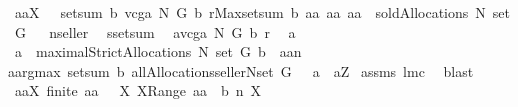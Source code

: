 \begin{isabellebody}
{\isacharparenleft}\ {\isachardoublequoteopen}{\isasymforall}aa{\isasymin}{\isacharquery}X{\isachardot}\ {\isacharunderscore}{\isachardoublequoteclose}{\isacharparenright}\ \ {\isachardoublequoteopen}setsum\ b\ {\isacharparenleft}vcga{\isacharprime}\ N\ G\ b\ r{\isacharparenright}{\isacharequal}Max{\isacharbraceleft}setsum\ b\ aa{\isacharbar}\ aa{\isachardot}\ aa\ {\isasymin}\ soldAllocations\ N\ {\isacharparenleft}set\ G{\isacharparenright}{\isacharbraceright}{\isachardoublequoteclose}\isanewline
%
\isadelimproof
%
\endisadelimproof
%
\isatagproof
{}\isamarkupfalse%
\ {\isacharminus}\isanewline
{}\isamarkupfalse%
\ {\isacharquery}n{\isacharequal}seller\ \isamarkupfalse%
\ {\isacharquery}s{\isacharequal}setsum\ \isamarkupfalse%
\ {\isacharquery}a{\isacharequal}{\isachardoublequoteopen}vcga{\isacharprime}\ N\ G\ b\ r{\isachardoublequoteclose}\ \isamarkupfalse%
\ a\ \ \isanewline
{}{\isacharcolon}\ {\isachardoublequoteopen}a\ {\isasymin}\ maximalStrictAllocations{\isacharprime}\ N\ {\isacharparenleft}set\ G{\isacharparenright}\ b\ {\isacharampersand}\ {\isacharquery}a{\isacharequal}a{\isacharminus}{\isacharminus}{\isacharquery}n\ {\isacharampersand}\ \isanewline
{\isacharparenleft}a{\isasymin}argmax\ {\isacharparenleft}setsum\ b{\isacharparenright}\ {\isacharparenleft}allAllocations{\isacharparenleft}{\isacharbraceleft}seller{\isacharbraceright}{\isasymunion}N{\isacharparenright}{\isacharparenleft}set\ G{\isacharparenright}{\isacharparenright}{\isacharparenright}{\isachardoublequoteclose}{\isacharparenleft}\ {\isachardoublequoteopen}{\isacharunderscore}\ {\isacharampersand}\ {\isacharquery}a{\isacharequal}{\isacharunderscore}\ {\isacharampersand}\ a{\isasymin}{\isacharquery}Z{\isachardoublequoteclose}{\isacharparenright}\isanewline
{}\isamarkupfalse%
\ assms{\isacharparenleft}{}{\isacharcomma}{}{\isacharcomma}{}{\isacharparenright}\ lm{}{}c\ \isamarkupfalse%
\ blast\ \isamarkupfalse%
\ \isanewline
{}{\isacharcolon}\ {\isachardoublequoteopen}{\isasymforall}aa{\isasymin}{\isacharquery}X{\isachardot}\ finite\ aa\ {\isacharampersand}\ {\isacharparenleft}{\isasymforall}\ X{\isachardot}\ X{\isasymin}Range\ aa\ {\isasymlongrightarrow}\ b\ {\isacharparenleft}{\isacharquery}n{\isacharcomma}\ X{\isacharparenright}{\isacharequal}{}{\isacharparenright}{\isachardoublequoteclose}\ \isamarkupfalse%

\end{isabellebody}
